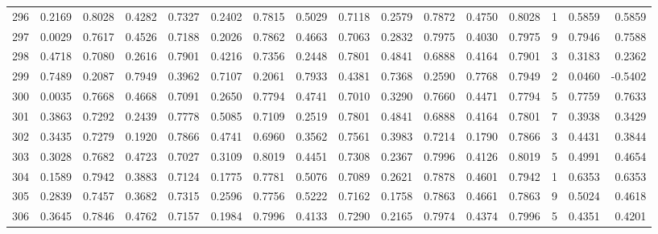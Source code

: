 \begin{tabular}{lrrrrrrrrrrrrrrr}
296 &      0.2169 &  0.8028 &  0.4282 &  0.7327 &  0.2402 &  0.7815 &  0.5029 &  0.7118 &  0.2579 &  0.7872 &   0.4750 &     0.8028 &      1 &                    0.5859 &                     0.5859 \\
297 &      0.0029 &  0.7617 &  0.4526 &  0.7188 &  0.2026 &  0.7862 &  0.4663 &  0.7063 &  0.2832 &  0.7975 &   0.4030 &     0.7975 &      9 &                    0.7946 &                     0.7588 \\
298 &      0.4718 &  0.7080 &  0.2616 &  0.7901 &  0.4216 &  0.7356 &  0.2448 &  0.7801 &  0.4841 &  0.6888 &   0.4164 &     0.7901 &      3 &                    0.3183 &                     0.2362 \\
299 &      0.7489 &  0.2087 &  0.7949 &  0.3962 &  0.7107 &  0.2061 &  0.7933 &  0.4381 &  0.7368 &  0.2590 &   0.7768 &     0.7949 &      2 &                    0.0460 &                    -0.5402 \\
300 &      0.0035 &  0.7668 &  0.4668 &  0.7091 &  0.2650 &  0.7794 &  0.4741 &  0.7010 &  0.3290 &  0.7660 &   0.4471 &     0.7794 &      5 &                    0.7759 &                     0.7633 \\
301 &      0.3863 &  0.7292 &  0.2439 &  0.7778 &  0.5085 &  0.7109 &  0.2519 &  0.7801 &  0.4841 &  0.6888 &   0.4164 &     0.7801 &      7 &                    0.3938 &                     0.3429 \\
302 &      0.3435 &  0.7279 &  0.1920 &  0.7866 &  0.4741 &  0.6960 &  0.3562 &  0.7561 &  0.3983 &  0.7214 &   0.1790 &     0.7866 &      3 &                    0.4431 &                     0.3844 \\
303 &      0.3028 &  0.7682 &  0.4723 &  0.7027 &  0.3109 &  0.8019 &  0.4451 &  0.7308 &  0.2367 &  0.7996 &   0.4126 &     0.8019 &      5 &                    0.4991 &                     0.4654 \\
304 &      0.1589 &  0.7942 &  0.3883 &  0.7124 &  0.1775 &  0.7781 &  0.5076 &  0.7089 &  0.2621 &  0.7878 &   0.4601 &     0.7942 &      1 &                    0.6353 &                     0.6353 \\
305 &      0.2839 &  0.7457 &  0.3682 &  0.7315 &  0.2596 &  0.7756 &  0.5222 &  0.7162 &  0.1758 &  0.7863 &   0.4661 &     0.7863 &      9 &                    0.5024 &                     0.4618 \\
306 &      0.3645 &  0.7846 &  0.4762 &  0.7157 &  0.1984 &  0.7996 &  0.4133 &  0.7290 &  0.2165 &  0.7974 &   0.4374 &     0.7996 &      5 &                    0.4351 &                     0.4201 \\

\end{tabular}
